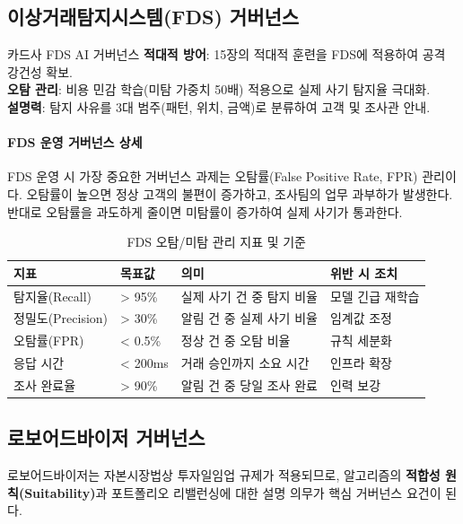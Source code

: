 \subsection{이상거래탐지시스템(FDS) 거버넌스}

\begin{practicaltool}{카드사 FDS AI 거버넌스}
\textbf{적대적 방어}: 15장의 적대적 훈련을 FDS에 적용하여 공격 강건성 확보.\\
\textbf{오탐 관리}: 비용 민감 학습(미탐 가중치 50배) 적용으로 실제 사기 탐지율 극대화.\\
\textbf{설명력}: 탐지 사유를 3대 범주(패턴, 위치, 금액)로 분류하여 고객 및 조사관 안내.
\end{practicaltool}

\paragraph{FDS 운영 거버넌스 상세}

FDS 운영 시 가장 중요한 거버넌스 과제는 오탐률(False Positive Rate, FPR) 관리이다. 오탐률이 높으면 정상 고객의 불편이 증가하고, 조사팀의 업무 과부하가 발생한다. 반대로 오탐률을 과도하게 줄이면 미탐률이 증가하여 실제 사기가 통과한다.

\begin{table}[htbp]
\centering
\caption{FDS 오탐/미탐 관리 지표 및 기준}
\label{tab:17_fds_metrics}
\begin{tabularx}{\textwidth}{p{3cm}p{2cm}Xp{3cm}}
\toprule
\textbf{지표} & \textbf{목표값} & \textbf{의미} & \textbf{위반 시 조치} \\
\midrule
탐지율(Recall) & > 95\% & 실제 사기 건 중 탐지 비율 & 모델 긴급 재학습 \\
정밀도(Precision) & > 30\% & 알림 건 중 실제 사기 비율 & 임계값 조정 \\
오탐률(FPR) & < 0.5\% & 정상 건 중 오탐 비율 & 규칙 세분화 \\
응답 시간 & < 200ms & 거래 승인까지 소요 시간 & 인프라 확장 \\
조사 완료율 & > 90\% & 알림 건 중 당일 조사 완료 & 인력 보강 \\
\bottomrule
\end{tabularx}
\end{table}

\subsection{로보어드바이저 거버넌스}

로보어드바이저는 자본시장법상 투자일임업 규제가 적용되므로, 알고리즘의 \textbf{적합성 원칙(Suitability)}과 포트폴리오 리밸런싱에 대한 설명 의무가 핵심 거버넌스 요건이 된다.

